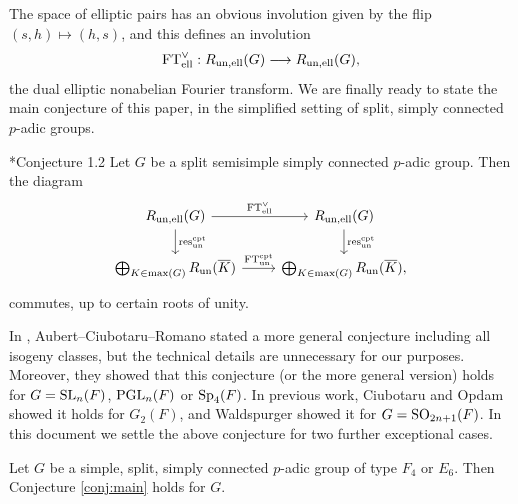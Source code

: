 The space of elliptic pairs has an obvious involution given by the flip $(s,h)\mapsto(h,s)$, and this defines an involution 
$$\mathrm{FT}^\vee_{\mathrm{ell}}:R_{\mathrm{un},\mathrm{ell}}(G)\longrightarrow R_{\mathrm{un},\mathrm{ell}}(G),$$
the dual elliptic nonabelian Fourier transform. We are finally ready to state the main conjecture of this paper, in the simplified setting of split, simply connected $p$-adic groups.
\begin{conjecture}\label{conj:main}\cite{AubertCiubotaruRomano2024}*{Conjecture 1.2}
    Let $G$ be a split semisimple simply connected $p$-adic group. Then the diagram 
    \[
        \begin{tikzcd}
        R_{\un,\text{ell}}(G) \arrow[r, "\FT^\vee_{\text{ell}}"] \arrow[d, "\res_{\un}^{\cpt}"] & R_{\un,\text{ell}}(G) \arrow[d, "\res_{\un}^{\cpt}"] \\
        \bigoplus_{K\in\max(G)}R_{\un}(\overline{K}) \arrow[r, "\FT^{\cpt}_{\un}"] & \bigoplus_{K\in\max(G)}R_{\un}(\overline{K}),
        \end{tikzcd}
    \]
    commutes, up to certain roots of unity.
\end{conjecture}

In \cite{AubertCiubotaruRomano2024}, Aubert--Ciubotaru--Romano stated a more general conjecture including all isogeny classes, but the technical details are unnecessary for our purposes. Moreover, they showed that this conjecture (or the more general version) holds for $G=\mathrm{SL}_n(F)$,  $\mathrm{PGL}_n(F)$ or $\mathrm{Sp}_4(F)$. In previous work, Ciubotaru and Opdam \cite{Ciubotaru2020} showed it holds for $G_2(F)$, and Waldspurger \cite{Waldspurger2018} showed it for $G=\mathrm{SO}_{2n+1}(F)$. In this document we settle the above conjecture for two further exceptional cases. 


\begin{theorem} Let $G$ be a simple, split, simply connected $p$-adic group of type $F_4$ or $E_6$. Then Conjecture \ref{conj:main} holds for $G$.
\end{theorem}

